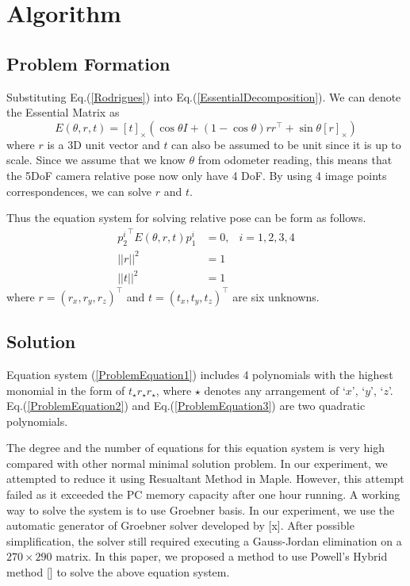 \documentclass[letterpaper, 10 pt, conference]{ieeeconf}
\begin{document}
\section{Algorithm}
\label{Algorithm}

\subsection{Problem Formation}
Substituting Eq.(\ref{Rodrigues}) into Eq.(\ref{EssentialDecomposition}). We can denote the Essential Matrix as 
\begin{equation}
E(\theta, r, t) = [t]_\times \left( \cos \theta I + (1 - \cos \theta) r r^\top + \sin \theta [ r ]_\times \right)
\end{equation}
where $r$ is a 3D unit vector and $t$ can also be assumed to be unit since it is up to scale. Since we assume that we know $\theta$ from odometer reading, this means that the 5DoF camera relative pose now only have 4 DoF. By using 4 image points correspondences, we can solve $r$ and $t$. 

Thus the equation system for solving relative pose can be form as follows. 
\begin{eqnarray}
\label{ProblemEquation1}
{p_2^i}^\top E(\theta, r, t) p_1^i & = 0,& i = 1, 2, 3, 4 \\
\label{ProblemEquation2}
|| r ||^2 & = 1 & \\
\label{ProblemEquation3}
|| t ||^2 & = 1 &
\end{eqnarray}
where $r = (r_x, r_y, r_z)^\top$ and $t = (t_x, t_y, t_z)^\top$ are six unknowns. 

\subsection{Solution}
\label{Solution}
Equation system (\ref{ProblemEquation1}) includes 4 polynomials with the highest monomial in the form of $t_\star r_\star r_\star$, where $\star$ denotes any arrangement of `$x$', `$y$', `$z$'. Eq.(\ref{ProblemEquation2}) and Eq.(\ref{ProblemEquation3}) are two quadratic polynomials. 

The degree and the number of equations for this equation system is very high  compared with other normal minimal solution problem. In our experiment, we attempted to reduce it using Resualtant Method in Maple. However, this attempt failed as it exceeded the PC memory capacity after one hour running. A working way to solve the system is to use Groebner basis. In our experiment, we use the automatic generator of Groebner solver developed by [x]. After possible simplification, the solver still required executing a Gauss-Jordan elimination on a $270 \times 290$ matrix. In this paper, we proposed a method to use Powell's Hybrid method [] to solve the above equation system. 
\end{document}
